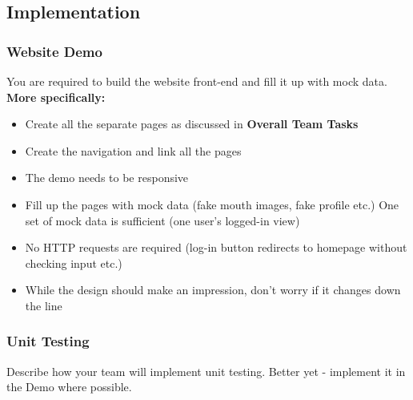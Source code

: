 \documentclass{article}
\begin{document}
\subsection{Implementation}
\subsubsection{Website Demo}
You are required to build the website front-end and fill it up with mock data. \\

\textbf{More specifically:}
\begin{itemize}
    \item Create all the separate pages as discussed in \textbf{Overall Team Tasks}
    \item Create the navigation and link all the pages
    \item The demo needs to be responsive
    \item Fill up the pages with mock data (fake mouth images, fake profile etc.) One set of mock data is sufficient (one user's logged-in view)
    \item No HTTP requests are required (log-in button redirects to homepage without checking input etc.)
    \item While the design should make an impression, don't worry if it changes down the line
\end{itemize}

\subsubsection{Unit Testing}
Describe how your team will implement unit testing. Better yet - implement it in the Demo where possible.
\end{document}
